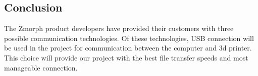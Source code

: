 \documentclass[letterpaper, onecolumn, draftclsnofoot, 10pt, compsoc]{IEEEtran}
\begin{document}
        \subsection{Conclusion}
                \begin{singlespace}
                The Zmorph product developers have provided their customers with three possible communication technologies.
                Of these technologies, USB connection will be used in the project for communication between the computer and 3d printer.
                This choice will provide our project with the best file transfer speeds and most manageable connection.
           
                \end{singlespace}
    
\newpage


\end{document}
